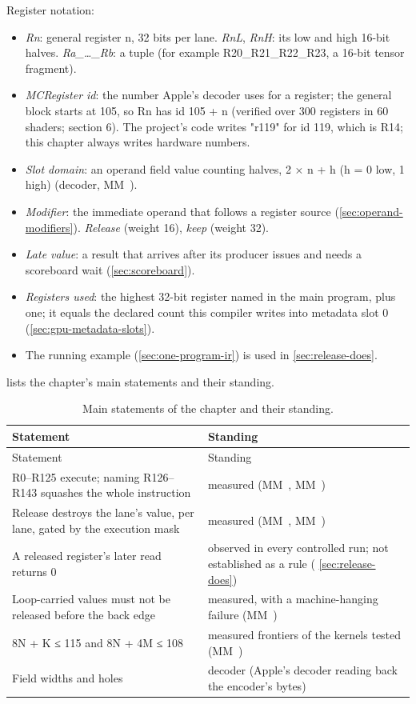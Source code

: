 Register notation:

\begin{itemize}
\item \emph{Rn}: general register n, 32 bits per lane. \emph{RnL}, \emph{RnH}: its low and high 16-bit halves. \emph{Ra\_\dots{}\_Rb}: a tuple
  (for example R20\_R21\_R22\_R23, a 16-bit tensor fragment).
\item \emph{MCRegister id}: the number Apple's decoder uses for a register; the general block starts at 105, so Rn has id
  105 + n (verified over 300 registers in 60 shaders;  section 6). The project's code writes
  "r119" for id 119, which is R14; this chapter always writes hardware numbers.
\item \emph{Slot domain}: an operand field value counting halves, 2 × n + h (h = 0 low, 1 high) (decoder, MM~).
\item \emph{Modifier}: the immediate operand that follows a register source (\cref{sec:operand-modifiers}). \emph{Release} (weight 16), \emph{keep}
  (weight 32).
\item \emph{Late value}: a result that arrives after its producer issues and needs a scoreboard wait (\cref{sec:scoreboard}).
\item \emph{Registers used}: the highest 32-bit register named in the main program, plus one; it equals the declared count
  this compiler writes into metadata slot 0 (\cref{sec:gpu-metadata-slots}).
\item The running example (\cref{sec:one-program-ir}) is used in \cref{sec:release-does}.
\end{itemize}

 lists the chapter's main statements and their standing.

\begin{xltabular}{\linewidth}{@{}XX@{}}
\caption{Main statements of the chapter and their standing.}\label{tab:register-statements}\\
\toprule
Statement & Standing \\
\midrule
\endfirsthead
{}
\toprule
Statement & Standing \\
\midrule
\endhead
R0–R125 execute; naming R126–R143 squashes the whole instruction & measured (MM~, MM~) \\*
Release destroys the lane's value, per lane, gated by
the execution mask & measured (MM~, MM~) \\*
A released register's later read returns 0 & observed in every controlled run; not established as a rule (
\cref{sec:release-does}) \\*
Loop-carried values must not be released before the back edge & measured, with a machine-hanging failure (MM~) \\*
8N + K ≤ 115 and 8N + 4M ≤ 108 & measured frontiers of the kernels tested (MM~) \\*
Field widths and holes & decoder (Apple's decoder reading back the
encoder's bytes) \\*
\bottomrule
\end{xltabular}

